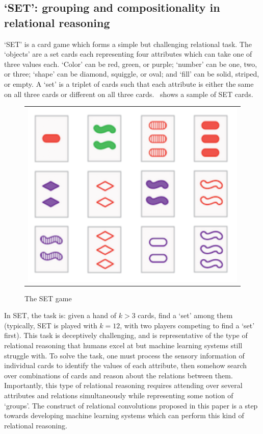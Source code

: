 \subsection{`SET': grouping and compositionality in relational reasoning}\label{ssec:experiments_set}

`SET' is a card game which forms a simple but challenging relational task. The `objects' are a set cards each representing four attributes which can take one of three values each. `Color' can be red, green, or purple; `number' can be one, two, or three; `shape' can be diamond, squiggle, or oval; and `fill' can be solid, striped, or empty. A `set' is a triplet of cards such that each attribute is either the same on all three cards or different on all three cards.~ shows a sample of SET cards.

\begin{figure}
	\vskip-5pt
	\begin{tabular}{c}
		\includegraphics[width=.25\textwidth]{figs/set_example}\\[-5pt]
	\end{tabular}
	\caption{\footnotesize The SET game}\label{fig:set_example}
\end{figure}
In SET, the task is: given a hand of $k > 3$ cards, find a `set' among them (typically, SET is played with $k=12$, with two players competing to find a `set' first). This task is deceptively challenging, and is representative of the type of relational reasoning that humans excel at but machine learning systems still struggle with. To solve the task, one must process the sensory information of individual cards to identify the values of each attribute, then somehow search over combinations of cards and reason about the relations between them. Importantly, this type of relational reasoning requires attending over several attributes and relations simultaneously while representing some notion of `groups'.  The construct of relational convolutions proposed in this paper is a step towards developing machine learning systems which can perform this kind of relational reasoning.


